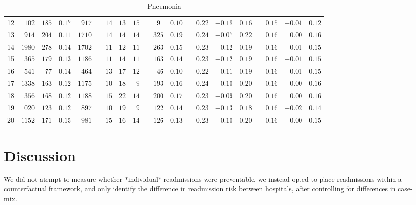 \documentclass[]{article}\usepackage[]{graphicx}\usepackage[]{color}
\begin{document}
\begin{landscape}
\begin{table}[!tbp]
\begin{center}
\begin{tabular}{lrrrrcrrrcrrcrrrcrrr}
12&$1102$&$185$&$0.17$&$ 917$&&$14$&$13$&$15$&&$ 91$&$0.10$&&$0.22$&$-0.18$&$0.16$&&$0.15$&$-0.04$&$0.12$\tabularnewline
13&$1914$&$204$&$0.11$&$1710$&&$14$&$14$&$14$&&$325$&$0.19$&&$0.24$&$-0.07$&$0.22$&&$0.16$&$ 0.00$&$0.16$\tabularnewline
14&$1980$&$278$&$0.14$&$1702$&&$11$&$12$&$11$&&$263$&$0.15$&&$0.23$&$-0.12$&$0.19$&&$0.16$&$-0.01$&$0.15$\tabularnewline
15&$1365$&$179$&$0.13$&$1186$&&$11$&$14$&$11$&&$163$&$0.14$&&$0.23$&$-0.12$&$0.19$&&$0.16$&$-0.01$&$0.15$\tabularnewline
16&$ 541$&$ 77$&$0.14$&$ 464$&&$13$&$17$&$12$&&$ 46$&$0.10$&&$0.22$&$-0.11$&$0.19$&&$0.16$&$-0.01$&$0.15$\tabularnewline
17&$1338$&$163$&$0.12$&$1175$&&$10$&$18$&$ 9$&&$193$&$0.16$&&$0.24$&$-0.10$&$0.20$&&$0.16$&$ 0.00$&$0.16$\tabularnewline
18&$1356$&$168$&$0.12$&$1188$&&$15$&$22$&$14$&&$200$&$0.17$&&$0.23$&$-0.09$&$0.20$&&$0.16$&$ 0.00$&$0.16$\tabularnewline
19&$1020$&$123$&$0.12$&$ 897$&&$10$&$19$&$ 9$&&$122$&$0.14$&&$0.23$&$-0.13$&$0.18$&&$0.16$&$-0.02$&$0.14$\tabularnewline
20&$1152$&$171$&$0.15$&$ 981$&&$15$&$16$&$14$&&$126$&$0.13$&&$0.23$&$-0.10$&$0.20$&&$0.16$&$ 0.00$&$0.15$\tabularnewline
\hline
\end{tabular}

\caption{Pneumonia\label{round}}\end{center}

\end{table}




\end{landscape}
\section{Discussion}


We did not atempt to measure whether *individual* readmissions were preventable, we instead opted to place readmissions within a counterfactual framework, and only identify the difference in readmission risk between hospitals, after controlling for differences in case-mix. 

\printbibliography
\end{document}
